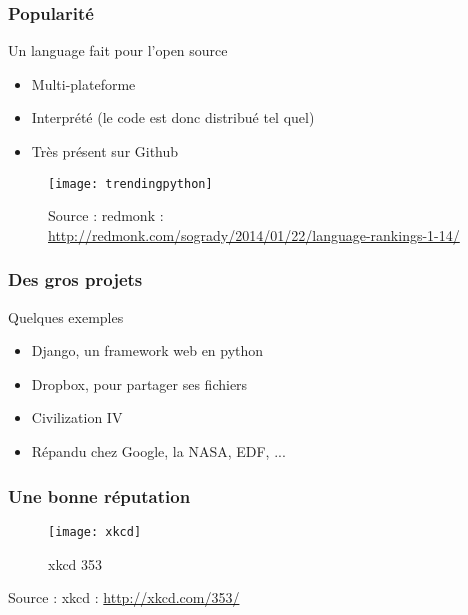 \documentclass{beamer}
\begin{document}
\begin{frame}
  \frametitle{Popularité}

  \begin{block}{Un language fait pour l'open source}
    \begin{itemize}
    \item Multi-plateforme
    \item Interprété (le code est donc distribué tel quel)
    \item Très présent sur Github
    \end{itemize}
    
  \end{block}

  \begin{figure}[H]
    \centering
    \texttt{[image: trendingpython]}
    \caption{Un langage qui monte qui monte...}
    \caption*{\tiny{Source : redmonk : \url{http://redmonk.com/sogrady/2014/01/22/language-rankings-1-14/}}}
    \label{fig:trendingpython}
  \end{figure}


\end{frame}

\begin{frame}
  \frametitle{Des gros projets}

  \begin{block}{Quelques exemples}
    \begin{itemize}
    \item Django, un framework web en python
    \item Dropbox, pour partager ses fichiers
    \item Civilization IV
    \item Répandu chez Google, la NASA, EDF, ...
    \end{itemize}

  \end{block}
    
\end{frame}

\begin{frame}
  \frametitle{Une bonne réputation}

  \begin{figure}[H]
    \centering
    \texttt{[image: xkcd]}
    \caption{xkcd 353}
    \label{fig:xkcd}
  \end{figure}
  \centering
  \tiny{Source : xkcd : \url{http://xkcd.com/353/}}

\end{frame}
\end{document}

